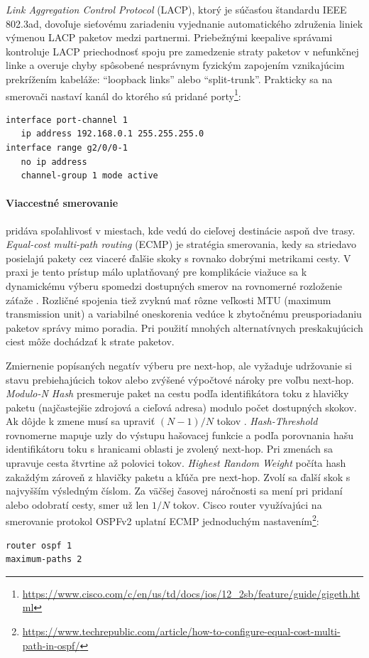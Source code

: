 \documentclass[12pt, a4paper]{article}
\begin{document}
\emph{Link Aggregation Control Protocol} (LACP), ktorý je súčasťou štandardu IEEE 802.3ad, dovoľuje 
sieťovému zariadeniu vyjednanie automatického združenia liniek výmenou LACP paketov medzi partnermi.
Priebežnými keepalive správami kontroluje LACP priechodnosť spoju pre zamedzenie straty paketov
v nefunkčnej linke a overuje chyby spôsobené nesprávnym fyzickým zapojením vznikajúcim prekrížením 
kabeláže: \enquote{loopback links} alebo \enquote{split-trunk}. Prakticky sa na smerovači nastaví kanál do 
ktorého sú pridané porty\footnote{\url{https://www.cisco.com/c/en/us/td/docs/ios/12_2sb/feature/guide/gigeth.html}}:
\begin{lstlisting}
interface port-channel 1
   ip address 192.168.0.1 255.255.255.0
interface range g2/0/0-1
   no ip address
   channel-group 1 mode active
\end{lstlisting}

\paragraph{Viaccestné smerovanie} pridáva spoľahlivosť v miestach, kde vedú do cieľovej destinácie aspoň
dve trasy. \emph{Equal-cost multi-path routing} (ECMP) je stratégia smerovania, kedy sa striedavo posielajú 
pakety cez viaceré ďalšie skoky s rovnako dobrými metrikami cesty. V praxi je tento prístup málo 
uplatňovaný pre komplikácie viažuce sa k dynamickému výberu spomedzi dostupných smerov na rovnomerné 
rozloženie záťaže \cite{RFC2991}. Rozličné spojenia tiež zvyknú mať rôzne veľkosti MTU (maximum transmission 
unit) a variabilné oneskorenia vedúce k zbytočnému preusporiadaniu paketov správy mimo poradia. Pri použití 
mnohých alternatívnych preskakujúcich ciest môže dochádzať k strate paketov. 

Zmiernenie popísaných negatív výberu pre next-hop, ale vyžaduje udržovanie si 
stavu prebiehajúcich tokov alebo zvýšené výpočtové nároky pre voľbu next-hop. \emph{Modulo-N Hash} 
presmeruje paket na cestu podľa identifikátora toku z hlavičky paketu (najčastejšie zdrojová a cieľová 
adresa) modulo počet dostupných skokov. Ak dôjde k zmene musí sa upraviť $(N-1)/N$ tokov
 \cite{RFC2991}. \emph{Hash-Threshold} rovnomerne mapuje uzly do výstupu hašovacej funkcie a podľa 
porovnania hašu identifikátoru toku s hranicami oblasti je zvolený next-hop. Pri zmenách sa upravuje cesta 
štvrtine až polovici tokov. \emph{Highest Random Weight} počíta hash zakaždým zároveň z hlavičky paketu a
kľúča pre next-hop. Zvolí sa ďalší skok s najvyšším výsledným číslom. Za väčšej časovej náročnosti
sa mení pri pridaní alebo odobratí cesty, smer už len $1/N$ tokov. Cisco router využívajúci na smerovanie
protokol OSPFv2 uplatní ECMP jednoduchým nastavením\footnote{\url{https://www.techrepublic.com/article/how-to-configure-equal-cost-multi-path-in-ospf/}}:
\begin{lstlisting}
router ospf 1
maximum-paths 2
\end{lstlisting}
\end{document}
